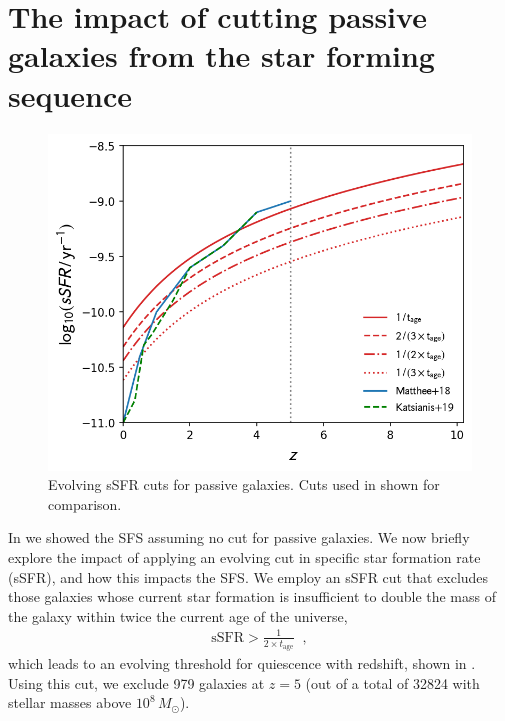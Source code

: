 \section{The impact of cutting passive galaxies from the star forming sequence}
\label{sec:ssfr_cut}

\begin{figure}
	\includegraphics[width=\columnwidth]{images/ssfr_cut.png}
    \caption{Evolving sSFR cuts for passive galaxies. Cuts used in \protect\cite{katsianis_evolving_2019,matthee_origin_2019} shown for comparison.
    }
    \label{fig:ssfr_cut}
\end{figure}

In  we showed the SFS assuming no cut for passive galaxies.
We now briefly explore the impact of applying an evolving cut in specific star formation rate (sSFR), and how this impacts the SFS.
We employ an sSFR cut that excludes those galaxies whose current star formation is insufficient to double the mass of the galaxy within twice the current age of the universe,
\begin{align}
\mathrm{sSFR} > \frac{1}{2 \times t_{\mathrm{age}}} \;\;,
\end{align}
which leads to an evolving threshold for quiescence with redshift, shown in .
Using this cut, we exclude 979 galaxies at $z = 5$ (out of a total of 32824 with stellar masses above $10^{8} \, M_{\odot}$).

